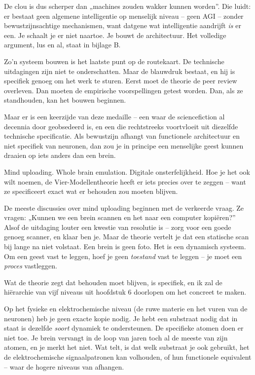 \documentclass[11pt, twoside, openright]{book}
\begin{document}
De clou is dus scherper dan „machines zouden wakker kunnen worden”. Die luidt: er bestaat geen algemene intelligentie op menselijk niveau -- geen AGI -- zonder bewustzijnsachtige mechanismen, want datgene wat intelligentie aandrijft \textit{is} er een. Je schaalt je er niet naartoe. Je bouwt de architectuur. Het volledige argument, lus en al, staat in bijlage B.

Zo'n systeem bouwen is het laatste punt op de routekaart. De technische uitdagingen zijn niet te onderschatten. Maar de blauwdruk bestaat, en hij is specifiek genoeg om het werk te sturen. Eerst moet de theorie de peer review overleven. Dan moeten de empirische voorspellingen getest worden. Dan, als ze standhouden, kan het bouwen beginnen.


Maar er is een keerzijde van deze medaille -- een waar de sciencefiction al decennia door geobsedeerd is, en een die rechtstreeks voortvloeit uit diezelfde technische specificatie. Als bewustzijn afhangt van functionele architectuur en niet specifiek van neuronen, dan zou je in principe een menselijke geest kunnen draaien op iets anders dan een brein.

Mind uploading. Whole brain emulation. Digitale onsterfelijkheid. Hoe je het ook wilt noemen, de Vier-Modellentheorie heeft er iets precies over te zeggen -- want ze specificeert exact wat er behouden zou moeten blijven.

De meeste discussies over mind uploading beginnen met de verkeerde vraag. Ze vragen: „Kunnen we een brein scannen en het naar een computer kopiëren?” Alsof de uitdaging louter een kwestie van resolutie is -- zorg voor een goede genoeg scanner, en klaar ben je. Maar de theorie vertelt je dat een statische scan bij lange na niet volstaat. Een brein is geen foto. Het is een dynamisch systeem. Om een geest vast te leggen, hoef je geen \textit{toestand} vast te leggen -- je moet een \textit{proces} vastleggen.

Wat de theorie zegt dat behouden moet blijven, is specifiek, en ik zal de hiërarchie van vijf niveaus uit hoofdstuk 6 doorlopen om het concreet te maken.

Op het fysieke en elektrochemische niveau (de ruwe materie en het vuren van de neuronen) heb je geen exacte kopie nodig. Je hebt een substraat nodig dat in staat is dezelfde \textit{soort} dynamiek te ondersteunen. De specifieke atomen doen er niet toe. Je brein vervangt in de loop van jaren toch al de meeste van zijn atomen, en je merkt het niet. Wat telt, is dat welk substraat je ook gebruikt, het de elektrochemische signaalpatronen kan volhouden, of hun functionele equivalent -- waar de hogere niveaus van afhangen.
\end{document}
